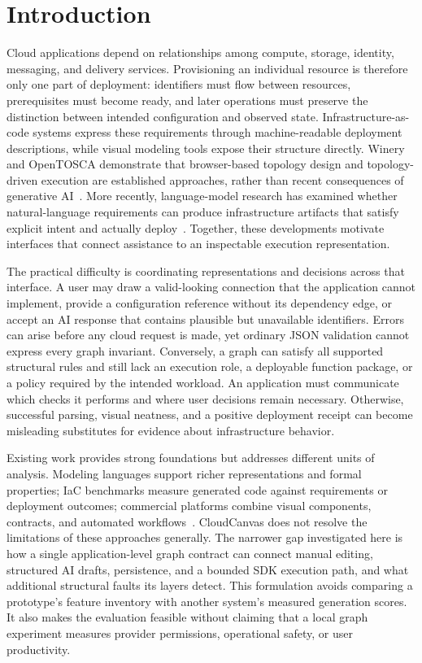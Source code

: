 \section{Introduction}
Cloud applications depend on relationships among compute, storage, identity, messaging, and delivery services. Provisioning an individual resource is therefore only one part of deployment: identifiers must flow between resources, prerequisites must become ready, and later operations must preserve the distinction between intended configuration and observed state. Infrastructure-as-code systems express these requirements through machine-readable deployment descriptions, while visual modeling tools expose their structure directly. Winery and OpenTOSCA demonstrate that browser-based topology design and topology-driven execution are established approaches, rather than recent consequences of generative AI~\cite{winery2013,opentosca2013}. More recently, language-model research has examined whether natural-language requirements can produce infrastructure artifacts that satisfy explicit intent and actually deploy~\cite{iaceval2024,iacgen2026}. Together, these developments motivate interfaces that connect assistance to an inspectable execution representation.

The practical difficulty is coordinating representations and decisions across that interface. A user may draw a valid-looking connection that the application cannot implement, provide a configuration reference without its dependency edge, or accept an AI response that contains plausible but unavailable identifiers. Errors can arise before any cloud request is made, yet ordinary JSON validation cannot express every graph invariant. Conversely, a graph can satisfy all supported structural rules and still lack an execution role, a deployable function package, or a policy required by the intended workload. An application must communicate which checks it performs and where user decisions remain necessary. Otherwise, successful parsing, visual neatness, and a positive deployment receipt can become misleading substitutes for evidence about infrastructure behavior.

Existing work provides strong foundations but addresses different units of analysis. Modeling languages support richer representations and formal properties; IaC benchmarks measure generated code against requirements or deployment outcomes; commercial platforms combine visual components, contracts, and automated workflows~\cite{doml2024,multi2025,massdriver}. CloudCanvas does not resolve the limitations of these approaches generally. The narrower gap investigated here is how a single application-level graph contract can connect manual editing, structured AI drafts, persistence, and a bounded SDK execution path, and what additional structural faults its layers detect. This formulation avoids comparing a prototype's feature inventory with another system's measured generation scores. It also makes the evaluation feasible without claiming that a local graph experiment measures provider permissions, operational safety, or user productivity.

